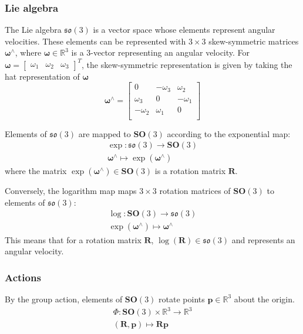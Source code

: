 		\subsubsection{Lie algebra}
		The Lie algebra $\mathfrak{so}(3)$ is a vector space whose elements represent angular velocities. These elements can be represented with $3 \times 3$ skew-symmetric matrices $\bm{\omega}^{\wedge}$, where $\bm{\omega} \in \mathbb{R}^3$ is a 3-vector representing an angular velocity. For
		$\bm{\omega} = 
		\begin{bmatrix}
			\omega_1 & \omega_2 & \omega_3
		\end{bmatrix}^T$, the skew-symmetric representation is given by taking the hat representation of $\bm{\omega}$
			\begin{equation}
				\bm{\omega}^{\wedge} =  
				\begin{bmatrix}
					0 			& -\omega_3 & \omega_2	\\
					\omega_3 	& 0 		& -\omega_1	\\
					-\omega_2 	& \omega_1 	& 0			\\
				\end{bmatrix}
			\end{equation}
		
		Elements of $\mathfrak{so}(3)$ are mapped to $\textbf{SO}(3)$ according to the exponential map:
		\begin{equation}
			\begin{split}
				\exp: \mathfrak{so}(3) \rightarrow \mathbf{SO}(3)\\
				\bm{\omega}^{\wedge} \mapsto \exp(\bm{\omega}^{\wedge})
			\end{split}		
		\end{equation}		
		where the matrix $\exp(\bm{\omega}^{\wedge}) \in  \mathbf{SO}(3)$ is a rotation matrix $\mathbf{R}$.
		
		Conversely, the logarithm map maps $3 \times 3$ rotation matrices of $\mathbf{SO}(3)$ to elements of $\mathfrak{so}(3)$:
		\begin{equation}
			\begin{split}
				\log: \mathbf{SO}(3) \rightarrow \mathfrak{so}(3)\\
				 \exp(\bm{\omega}^{\wedge}) \mapsto \bm{\omega}^{\wedge}
			\end{split}		
		\end{equation}		
		This means that for a rotation matrix $\mathbf{R}$, $\log(\mathbf{R}) \in \mathfrak{so}(3)$ and represents an angular velocity.
		
		\subsubsection{Actions}
		By the group action, elements of $\mathbf{SO}(3)$ rotate points $\mathbf{p} \in \mathbb{R}^3$ about the origin. 
		\begin{equation}
			\begin{split}
				\Phi: \mathbf{SO}(3) \times \mathbb{R}^3 \rightarrow \mathbb{R}^3\\
				(\mathbf{R},\mathbf{p}) \mapsto \mathbf{Rp}
			\end{split}	
		\end{equation}
		
